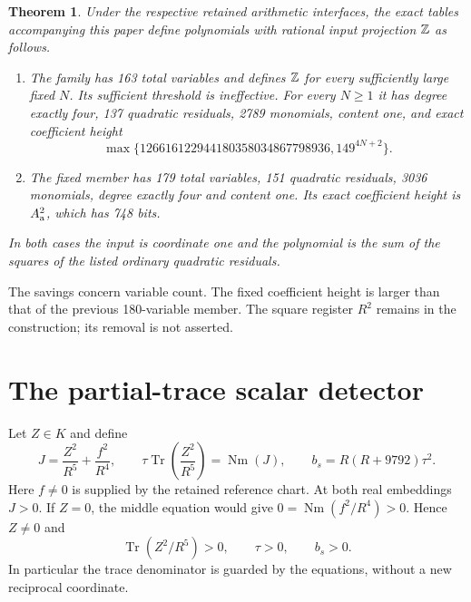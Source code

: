 \documentclass[11pt]{article}
\newtheorem{theorem}{Theorem}
\theoremstyle{remark}\newtheorem{remark}[theorem]{Remark}
\newcommand{\Tr}{\operatorname{Tr}}\newcommand{\Nm}{\operatorname{Nm}}
\begin{document}
\begin{theorem}\label{thm:main}
Under the respective retained arithmetic interfaces, the exact
tables accompanying this paper define polynomials with rational
input projection $\mathbb Z$ as follows.
\begin{enumerate}
\item The family has 163 total variables and defines $\mathbb Z$ for
every sufficiently large fixed $N$. Its sufficient threshold is
ineffective. For every $N\ge1$ it has degree exactly four,
137 quadratic residuals, 2789 monomials, content one, and exact
coefficient height
\[
 \max\{126616122944180358034867798936,149^{4N+2}\}.
\]
\item The fixed member has 179 total variables, 151 quadratic
residuals, 3036 monomials, degree exactly four and content one.
Its exact coefficient height is $A_{\rm a}^2$, which has 748 bits.
\end{enumerate}
In both cases the input is coordinate one and the polynomial is
the sum of the squares of the listed ordinary quadratic residuals.
\end{theorem}

The savings concern variable count. The fixed coefficient height
is larger than that of the previous 180-variable member.
The square register $R^2$ remains in the construction; its removal
is not asserted.

\section{The partial-trace scalar detector}
Let $Z\in K$ and define
\begin{equation}\label{eq:scalar}
 J=\frac{Z^2}{R^5}+\frac{f^2}{R^4},\qquad
 \tau\Tr\left(\frac{Z^2}{R^5}\right)=\Nm(J),\qquad
 b_s=R(R+9792)\tau^2.
\end{equation}
Here $f\ne0$ is supplied by the retained reference chart.
At both real embeddings $J>0$. If $Z=0$, the middle equation
would give $0=\Nm(f^2/R^4)>0$. Hence $Z\ne0$ and
\[
 \Tr(Z^2/R^5)>0,\qquad \tau>0,\qquad b_s>0.
\]
In particular the trace denominator is guarded by the equations,
without a new reciprocal coordinate.
\end{document}
